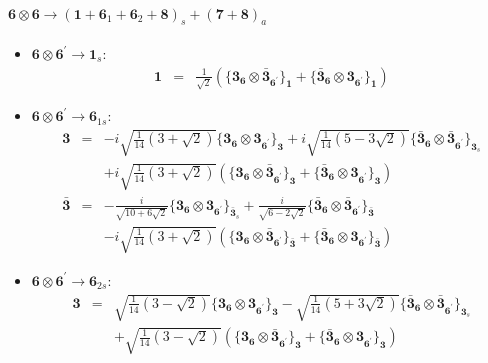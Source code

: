 \documentclass[english]{article}
\newcommand{\subcg}[3]{\big\{ {#1}\otimes{#2}\big\}^{}_{#3}}
\newcommand{\rep}[1]{\mathbf{#1}}
\begin{document}
\paragraph*{\Large $\rep{6}\otimes\rep{6}\to\left(\rep{1}+\rep{6}_{1}+\rep{6}_{2}+\rep{8}\right)_s+\left(\rep{7}+\rep{8}\right)_a$}
\begin{itemize}
\item $\rep{6}\otimes\rep{6^{\prime}}\to\rep{1}_{s}$:
\begin{eqnarray*}
\rep{1} &=& \frac{1}{\sqrt{2}}\left(\subcg{\rep{3}_{\rep{6}}}{\rep{\bar{3}}_{\rep{6^{\prime}}}}{\rep{1}}+\subcg{\rep{\bar{3}}_{\rep{6}}}{\rep{3}_{\rep{6^{\prime}}}}{\rep{1}}\right)
\end{eqnarray*}
\item $\rep{6}\otimes\rep{6^{\prime}}\to\rep{6}_{1s}$:
\begin{eqnarray*}
\rep{3} &=& -i \sqrt{\frac{1}{14} \left(3+\sqrt{2}\right)}\subcg{\rep{3}_{\rep{6}}}{\rep{3}_{\rep{6^{\prime}}}}{\rep{3}}+i \sqrt{\frac{1}{14} \left(5-3 \sqrt{2}\right)}\subcg{\rep{\bar{3}}_{\rep{6}}}{\rep{\bar{3}}_{\rep{6^{\prime}}}}{\rep{3}_{s}} \\ 
 & & +i \sqrt{\frac{1}{14} \left(3+\sqrt{2}\right)}\left(\subcg{\rep{3}_{\rep{6}}}{\rep{\bar{3}}_{\rep{6^{\prime}}}}{\rep{3}}+\subcg{\rep{\bar{3}}_{\rep{6}}}{\rep{3}_{\rep{6^{\prime}}}}{\rep{3}}\right)
\\
\rep{\bar{3}} &=& -\frac{i}{\sqrt{10+6 \sqrt{2}}}\subcg{\rep{3}_{\rep{6}}}{\rep{3}_{\rep{6^{\prime}}}}{\rep{\bar{3}}_{s}}+\frac{i}{\sqrt{6-2 \sqrt{2}}}\subcg{\rep{\bar{3}}_{\rep{6}}}{\rep{\bar{3}}_{\rep{6^{\prime}}}}{\rep{\bar{3}}} \\ 
 & & -i \sqrt{\frac{1}{14} \left(3+\sqrt{2}\right)}\left(\subcg{\rep{3}_{\rep{6}}}{\rep{\bar{3}}_{\rep{6^{\prime}}}}{\rep{\bar{3}}}+\subcg{\rep{\bar{3}}_{\rep{6}}}{\rep{3}_{\rep{6^{\prime}}}}{\rep{\bar{3}}}\right)
\end{eqnarray*}
\item $\rep{6}\otimes\rep{6^{\prime}}\to\rep{6}_{2s}$:
\begin{eqnarray*}
\rep{3} &=& \sqrt{\frac{1}{14} \left(3-\sqrt{2}\right)}\subcg{\rep{3}_{\rep{6}}}{\rep{3}_{\rep{6^{\prime}}}}{\rep{3}}-\sqrt{\frac{1}{14} \left(5+3 \sqrt{2}\right)}\subcg{\rep{\bar{3}}_{\rep{6}}}{\rep{\bar{3}}_{\rep{6^{\prime}}}}{\rep{3}_{s}} \\ 
 & & +\sqrt{\frac{1}{14} \left(3-\sqrt{2}\right)}\left(\subcg{\rep{3}_{\rep{6}}}{\rep{\bar{3}}_{\rep{6^{\prime}}}}{\rep{3}}+\subcg{\rep{\bar{3}}_{\rep{6}}}{\rep{3}_{\rep{6^{\prime}}}}{\rep{3}}\right)

\end{eqnarray*}
\end{itemize}
\end{document}
